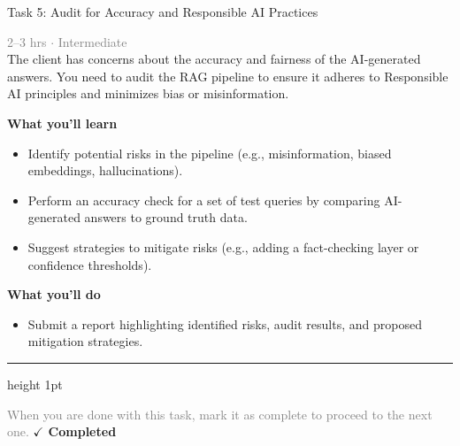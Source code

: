 \documentclass[10pt,a4paper]{article}
\begin{document}
\begin{taskbox}{Task 5: Audit for Accuracy and Responsible AI Practices}

    {\small \textcolor{gray}{2--3 hrs $\cdot$ Intermediate}}\\[12pt]

     The client has concerns about the accuracy and fairness of the AI-generated answers. You need to audit the RAG pipeline to ensure it adheres to Responsible AI principles and minimizes bias or misinformation.  


\vspace{8pt}
{\large \textbf{\textcolor{brandLight}{What you'll learn}}}\\[4pt]  
\begin{itemize}
    \item Identify potential risks in the pipeline (e.g., misinformation, biased embeddings, hallucinations).  
    \item Perform an accuracy check for a set of test queries by comparing AI-generated answers to ground truth data.  
    \item Suggest strategies to mitigate risks (e.g., adding a fact-checking layer or confidence thresholds).  
\end{itemize}

\vspace{8pt}
{\large \textbf{\textcolor{brandLight}{What you'll do}}}\\[4pt]  
\begin{itemize}
    \item Submit a report highlighting identified risks, audit results, and proposed mitigation strategies.\par
\end{itemize}

    \vspace{16pt}

    \textcolor{cardBorder}{\hrule height 1pt}\vspace{8pt}

    \small \textcolor{gray}{When you are done with this task, mark it as complete to proceed to the next one.} \hfill \textbf{\textcolor{brandDark}{$\checkmark$ Completed}}

\end{taskbox}
\end{document}
